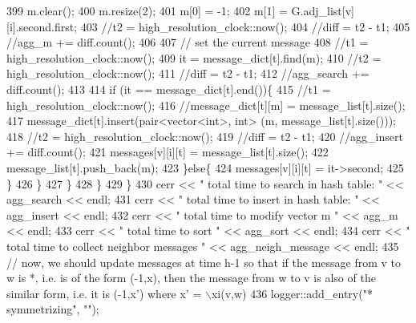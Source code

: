 \begin{DoxyCode}
399 \textcolor{comment}{          m.clear();}
400 \textcolor{comment}{          m.resize(2);}
401 \textcolor{comment}{          m[0] = -1;}
402 \textcolor{comment}{          m[1] = G.adj\_list[v][i].second.first;}
403 \textcolor{comment}{          //t2 = high\_resolution\_clock::now();}
404 \textcolor{comment}{          //diff = t2 - t1;}
405 \textcolor{comment}{          //agg\_m += diff.count();}
406 \textcolor{comment}{}
407 \textcolor{comment}{          // set the current message}
408 \textcolor{comment}{          //t1 = high\_resolution\_clock::now();}
409 \textcolor{comment}{          it = message\_dict[t].find(m);}
410 \textcolor{comment}{          //t2 = high\_resolution\_clock::now();}
411 \textcolor{comment}{          //diff = t2 - t1;}
412 \textcolor{comment}{          //agg\_search += diff.count();}
413 \textcolor{comment}{}
414 \textcolor{comment}{          if (it == message\_dict[t].end())\{}
415 \textcolor{comment}{            //t1 = high\_resolution\_clock::now();}
416 \textcolor{comment}{            //message\_dict[t][m] = message\_list[t].size();}
417 \textcolor{comment}{            message\_dict[t].insert(pair<vector<int>, int> (m, message\_list[t].size()));}
418 \textcolor{comment}{            //t2 = high\_resolution\_clock::now();}
419 \textcolor{comment}{            //diff = t2 - t1;}
420 \textcolor{comment}{            //agg\_insert += diff.count();}
421 \textcolor{comment}{            messages[v][i][t] = message\_list[t].size();}
422 \textcolor{comment}{            message\_list[t].push\_back(m);}
423 \textcolor{comment}{          \}else\{}
424 \textcolor{comment}{            messages[v][i][t] = it->second;}
425 \textcolor{comment}{          \}}
426 \textcolor{comment}{        \}}
427 \textcolor{comment}{      \}}
428 \textcolor{comment}{    \}}
429 \textcolor{comment}{  \}}
430 \textcolor{comment}{  cerr << " total time to search in hash table: " << agg\_search << endl;}
431 \textcolor{comment}{  cerr << " total time to insert in hash table: " << agg\_insert << endl;}
432 \textcolor{comment}{  cerr << " total time to modify vector m  " << agg\_m << endl;}
433 \textcolor{comment}{  cerr << " total time to sort  " << agg\_sort << endl;}
434 \textcolor{comment}{  cerr << " total time to collect neighbor messages " <<  agg\_neigh\_message << endl;}
435 \textcolor{comment}{  // now, we should update messages at time h-1 so that if the message from v to w is *, i.e. is of the
       form (-1,x), then the message from w to v is also of the similar form, i.e. it is (-1,x') where x' = \(\backslash\)xi(v,w)}
436 \textcolor{comment}{  logger::add\_entry("* symmetrizing", "");}

\end{DoxyCode}
